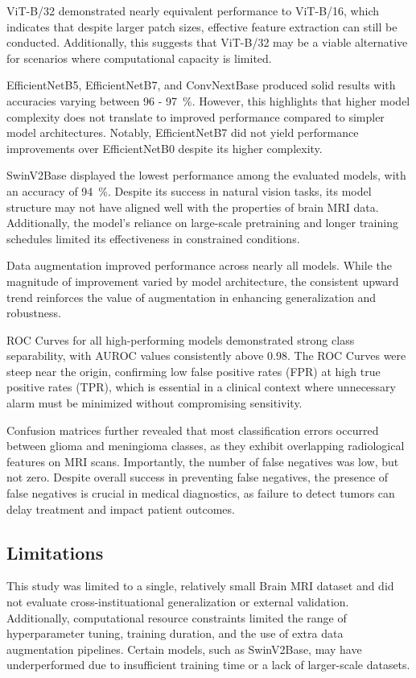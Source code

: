 \documentclass[11pt]{article}
\begin{document}
ViT-B/32 demonstrated nearly equivalent performance to ViT-B/16, which indicates that despite larger patch sizes, effective feature extraction can still be conducted. Additionally, this suggests that ViT-B/32 may be a viable alternative for scenarios where computational capacity is limited.

EfficientNetB5, EfficientNetB7, and ConvNextBase produced solid results with accuracies varying between 96 - 97~\%.  However, this highlights that higher model complexity does not translate to improved performance compared to simpler model architectures. Notably, EfficientNetB7 did not yield performance improvements over EfficientNetB0 despite its higher complexity.

SwinV2Base displayed the lowest performance among the evaluated models, with an accuracy of 94~\%. Despite its success in natural vision tasks, its model structure may not have aligned well with the properties of brain MRI data. Additionally, the model's reliance on large-scale pretraining and longer training schedules limited its effectiveness in constrained conditions.

Data augmentation improved performance across nearly all models. While the magnitude of improvement varied by model architecture, the consistent upward trend reinforces the value of augmentation in enhancing generalization and robustness.

ROC Curves for all high-performing models demonstrated strong class separability, with AUROC values consistently above 0.98. The ROC Curves were steep near the origin, confirming low false positive rates (FPR) at high true positive rates (TPR), which is essential in a clinical context where unnecessary alarm must be minimized without compromising sensitivity.

Confusion matrices further revealed that most classification errors occurred between glioma and meningioma classes, as they exhibit overlapping radiological features on MRI scans. Importantly, the number of false negatives was low, but not zero. Despite overall success in preventing false negatives, the presence of false negatives is crucial in medical diagnostics, as failure to detect tumors can delay treatment and impact patient outcomes.

\subsection*{Limitations}

This study was limited to a single, relatively small Brain MRI dataset and did not evaluate cross-instituational generalization or external validation. Additionally, computational resource constraints limited the range of hyperparameter tuning, training duration, and the use of extra data augmentation pipelines. Certain models, such as SwinV2Base, may have underperformed due to insufficient training time or a lack of larger-scale datasets.
\end{document}
